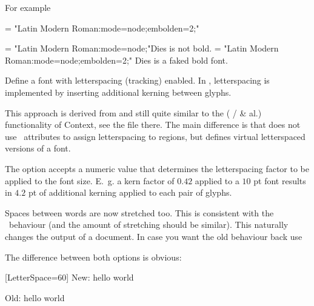          For example

         \beginlisting
      \font\test = "Latin Modern Roman:mode=node;embolden=2;"
         \endlisting

      {\font\test= "Latin Modern Roman:mode=node;"\test Dies is not bold.
       \font\test= "Latin Modern Roman:mode=node;embolden=2;" \test Dies is a faked bold font.}

  \endaltitem

  \label{p:letterspace}
         Define a font with letterspacing (tracking) enabled.
         In , letterspacing is implemented by
         inserting additional kerning between glyphs.

         This approach is derived from and still quite similar to the
          ( /
          \& al.) functionality of
         Context, see the file  there.
         The main difference is that  does not
         use \LuaTeX\ attributes to assign letterspacing to regions,
         but defines virtual letterspaced versions of a font.

         The option  accepts a numeric value that
         determines the letterspacing factor to be applied to the font
         size.
         E.~g. a kern factor of $0.42$ applied to a $10$ pt font
         results in $4.2$ pt of additional kerning applied to each
         pair of glyphs.

         Spaces between words are now
         stretched too. This is consistent with the \XeTeX\ behaviour (and the amount of stretching should be similar). This
         naturally changes the output of a document.  In case you want the old behaviour back use
         \beginlisting
         \endlisting

         The difference between both options is obvious:

         \begingroup
         [LetterSpace=60]
          New: hello world


          Old: hello world

          \endgroup



